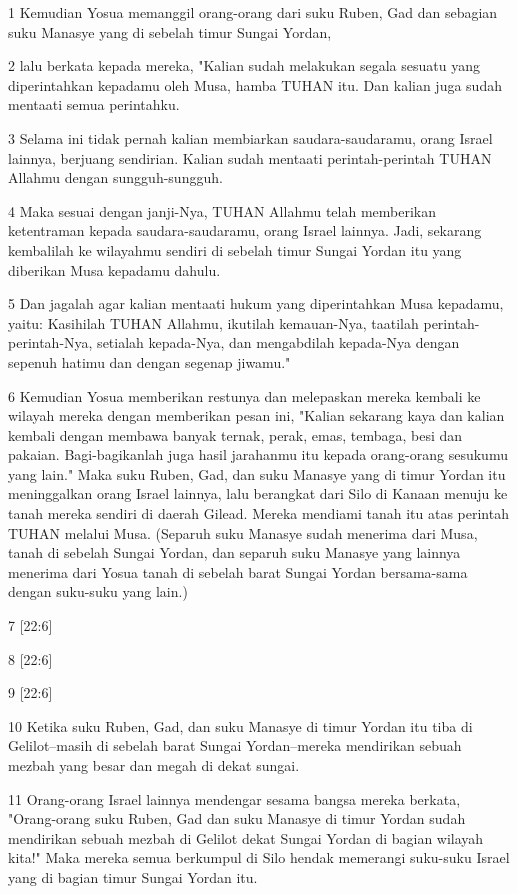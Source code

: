 \par 1 Kemudian Yosua memanggil orang-orang dari suku Ruben, Gad dan sebagian suku Manasye yang di sebelah timur Sungai Yordan,
\par 2 lalu berkata kepada mereka, "Kalian sudah melakukan segala sesuatu yang diperintahkan kepadamu oleh Musa, hamba TUHAN itu. Dan kalian juga sudah mentaati semua perintahku.
\par 3 Selama ini tidak pernah kalian membiarkan saudara-saudaramu, orang Israel lainnya, berjuang sendirian. Kalian sudah mentaati perintah-perintah TUHAN Allahmu dengan sungguh-sungguh.
\par 4 Maka sesuai dengan janji-Nya, TUHAN Allahmu telah memberikan ketentraman kepada saudara-saudaramu, orang Israel lainnya. Jadi, sekarang kembalilah ke wilayahmu sendiri di sebelah timur Sungai Yordan itu yang diberikan Musa kepadamu dahulu.
\par 5 Dan jagalah agar kalian mentaati hukum yang diperintahkan Musa kepadamu, yaitu: Kasihilah TUHAN Allahmu, ikutilah kemauan-Nya, taatilah perintah-perintah-Nya, setialah kepada-Nya, dan mengabdilah kepada-Nya dengan sepenuh hatimu dan dengan segenap jiwamu."
\par 6 Kemudian Yosua memberikan restunya dan melepaskan mereka kembali ke wilayah mereka dengan memberikan pesan ini, "Kalian sekarang kaya dan kalian kembali dengan membawa banyak ternak, perak, emas, tembaga, besi dan pakaian. Bagi-bagikanlah juga hasil jarahanmu itu kepada orang-orang sesukumu yang lain." Maka suku Ruben, Gad, dan suku Manasye yang di timur Yordan itu meninggalkan orang Israel lainnya, lalu berangkat dari Silo di Kanaan menuju ke tanah mereka sendiri di daerah Gilead. Mereka mendiami tanah itu atas perintah TUHAN melalui Musa. (Separuh suku Manasye sudah menerima dari Musa, tanah di sebelah Sungai Yordan, dan separuh suku Manasye yang lainnya menerima dari Yosua tanah di sebelah barat Sungai Yordan bersama-sama dengan suku-suku yang lain.)
\par 7 [22:6]
\par 8 [22:6]
\par 9 [22:6]
\par 10 Ketika suku Ruben, Gad, dan suku Manasye di timur Yordan itu tiba di Gelilot--masih di sebelah barat Sungai Yordan--mereka mendirikan sebuah mezbah yang besar dan megah di dekat sungai.
\par 11 Orang-orang Israel lainnya mendengar sesama bangsa mereka berkata, "Orang-orang suku Ruben, Gad dan suku Manasye di timur Yordan sudah mendirikan sebuah mezbah di Gelilot dekat Sungai Yordan di bagian wilayah kita!" Maka mereka semua berkumpul di Silo hendak memerangi suku-suku Israel yang di bagian timur Sungai Yordan itu.
